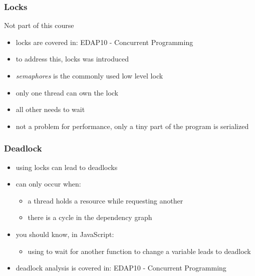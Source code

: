 \begin{frame}[fragile] \frametitle{Locks}
Not part of this course
\begin{itemize}
  \item locks are covered in: EDAP10 - Concurrent Programming
  \item to address this, locks was introduced
  \item \emph{semaphores} is the commonly used low level lock
  \item only one thread can own the lock
  \item all other needs to wait
  \item not a problem for performance, only a tiny part of the program is serialized
\end{itemize}
\end{frame}

\begin{frame}[fragile] \frametitle{Deadlock}
\begin{itemize}
  \item using locks can lead to deadlocks
  \item can only occur when:
  \begin{itemize}
    \item a thread holds a resource while requesting another
    \item there is a cycle in the dependency graph
  \end{itemize}
  \item you should know, in JavaScript:
  \begin{itemize}
    \item using  to wait for another function to change a variable leads to deadlock
  \end{itemize}
  \item deadlock analysis is covered in: EDAP10 - Concurrent Programming
\end{itemize}
\end{frame}

